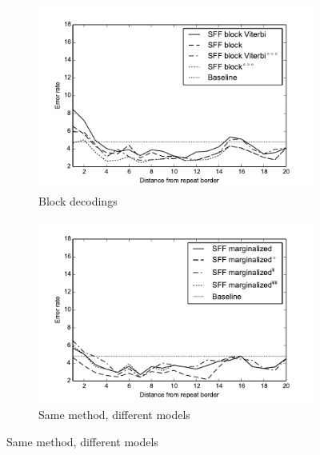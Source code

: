 \begin{figure}
\begin{center}
\begin{subfigure}{0.5\textwidth}
\includegraphics[width=\textwidth]{../figures/error_graph_sffblock.pdf}
\caption{Block decodings}\label{FIGURE:SFFBLOCKS}
\end{subfigure}%
\begin{subfigure}{0.5\textwidth}
\includegraphics[width=\textwidth]{../figures/error_graph_marginalized.pdf}
\caption{Same method, different models}\label{FIGURE:SFFWEIRD}
\end{subfigure}%


\end{center}
\end{figure}
